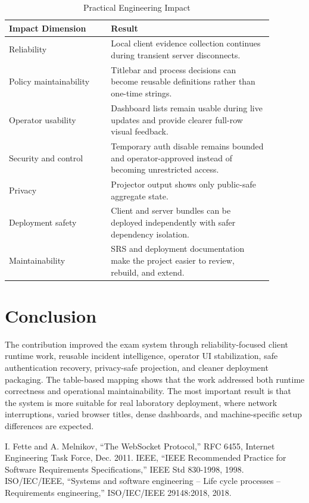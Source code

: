 \documentclass[conference]{IEEEtran}
\begin{document}
\begin{table}[htbp]
\caption{Practical Engineering Impact}
\centering
\begin{tabular}{P{0.34\linewidth} P{0.54\linewidth}}
\toprule
\textbf{Impact Dimension} & \textbf{Result} \\
\midrule
Reliability & Local client evidence collection continues during transient server disconnects. \\
\midrule
Policy maintainability & Titlebar and process decisions can become reusable definitions rather than one-time strings. \\
\midrule
Operator usability & Dashboard lists remain usable during live updates and provide clearer full-row visual feedback. \\
\midrule
Security and control & Temporary auth disable remains bounded and operator-approved instead of becoming unrestricted access. \\
\midrule
Privacy & Projector output shows only public-safe aggregate state. \\
\midrule
Deployment safety & Client and server bundles can be deployed independently with safer dependency isolation. \\
\midrule
Maintainability & SRS and deployment documentation make the project easier to review, rebuild, and extend. \\
\bottomrule
\end{tabular}
\label{tab:impact}
\end{table}

\section{Conclusion}

The contribution improved the exam system through reliability-focused client runtime work, reusable incident intelligence, operator UI stabilization, safe authentication recovery, privacy-safe projection, and cleaner deployment packaging. The table-based mapping shows that the work addressed both runtime correctness and operational maintainability. The most important result is that the system is more suitable for real laboratory deployment, where network interruptions, varied browser titles, dense dashboards, and machine-specific setup differences are expected.

\begin{thebibliography}{00}
 I. Fette and A. Melnikov, ``The WebSocket Protocol,'' RFC 6455, Internet Engineering Task Force, Dec. 2011.
 IEEE, ``IEEE Recommended Practice for Software Requirements Specifications,'' IEEE Std 830-1998, 1998.
 ISO/IEC/IEEE, ``Systems and software engineering -- Life cycle processes -- Requirements engineering,'' ISO/IEC/IEEE 29148:2018, 2018.
\end{thebibliography}
\end{document}

